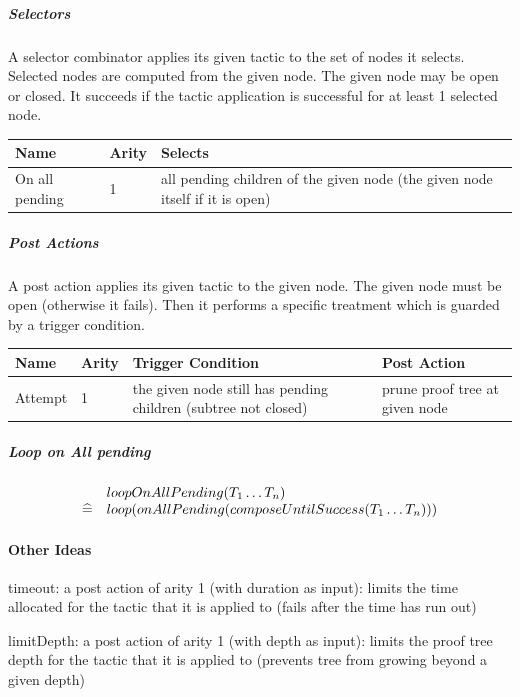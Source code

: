 \subparagraph{Selectors}

A selector combinator applies its given tactic to the set of nodes it selects. Selected nodes are computed from the given node. The given node may be open or closed. It succeeds if the tactic application is successful for at least 1 selected node. 

\begin{center}
    \begin{tabular}{ | l | l | p{} |}
    \hline
	Name & Arity & Selects \\ \hline
	On all pending  & 1 & all pending children of the given node (the given node itself if it is open) \\ \hline
    \end{tabular}
\end{center}

\subparagraph{Post Actions}

A post action applies its given tactic to the given node. The given node must be open (otherwise it fails). Then it performs a specific treatment which is guarded by a trigger condition. 

\begin{center}
    \begin{tabular}{ | l | l | p{} | p{} |}
    \hline
	Name & Arity & Trigger Condition & Post Action \\ \hline
	Attempt & 1 & the given node still has pending children (subtree not closed) & prune proof tree at given node  \\ \hline
    \end{tabular}
\end{center}

\subparagraph{Loop on All pending}
\[
\begin{array}{rl}
        & loopOnAllPending(T_1 \ldots T_n) \\
  \mathrel{\widehat=} & loop(onAllPending(composeUntilSuccess(T_1 \ldots T_n)))
\end{array}
\]

\paragraph{Other Ideas}

    timeout: a post action of arity 1 (with duration as input): limits the time allocated for the tactic that it is applied to (fails after the time has run out)

    limitDepth: a post action of arity 1 (with depth as input): limits the proof tree depth for the tactic that it is applied to (prevents tree from growing beyond a given depth)

